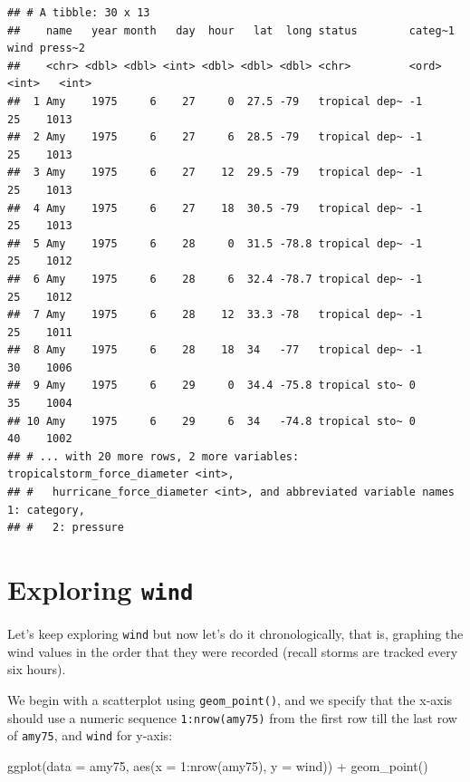 \documentclass[
]{book}
\newenvironment{Shaded}{\begin{snugshade}}{\end{snugshade}}
\newcommand{\AttributeTok}[1]{\textcolor[rgb]{0.77,0.63,0.00}{#1}}
\newcommand{\DecValTok}[1]{\textcolor[rgb]{0.00,0.00,0.81}{#1}}
\newcommand{\FunctionTok}[1]{\textcolor[rgb]{0.00,0.00,0.00}{#1}}
\newcommand{\NormalTok}[1]{#1}
\newcommand{\SpecialCharTok}[1]{\textcolor[rgb]{0.00,0.00,0.00}{#1}}
\begin{document}
\begin{verbatim}
## # A tibble: 30 x 13
##    name   year month   day  hour   lat  long status        categ~1  wind press~2
##    <chr> <dbl> <dbl> <int> <dbl> <dbl> <dbl> <chr>         <ord>   <int>   <int>
##  1 Amy    1975     6    27     0  27.5 -79   tropical dep~ -1         25    1013
##  2 Amy    1975     6    27     6  28.5 -79   tropical dep~ -1         25    1013
##  3 Amy    1975     6    27    12  29.5 -79   tropical dep~ -1         25    1013
##  4 Amy    1975     6    27    18  30.5 -79   tropical dep~ -1         25    1013
##  5 Amy    1975     6    28     0  31.5 -78.8 tropical dep~ -1         25    1012
##  6 Amy    1975     6    28     6  32.4 -78.7 tropical dep~ -1         25    1012
##  7 Amy    1975     6    28    12  33.3 -78   tropical dep~ -1         25    1011
##  8 Amy    1975     6    28    18  34   -77   tropical dep~ -1         30    1006
##  9 Amy    1975     6    29     0  34.4 -75.8 tropical sto~ 0          35    1004
## 10 Amy    1975     6    29     6  34   -74.8 tropical sto~ 0          40    1002
## # ... with 20 more rows, 2 more variables: tropicalstorm_force_diameter <int>,
## #   hurricane_force_diameter <int>, and abbreviated variable names 1: category,
## #   2: pressure
\end{verbatim}

\hypertarget{exploring-wind}{%
\section{\texorpdfstring{Exploring \texttt{wind}}{Exploring wind}}\label{exploring-wind}}

Let's keep exploring \texttt{wind} but now let's do it chronologically, that is,
graphing the wind values in the order that they were recorded (recall storms
are tracked every six hours).

We begin with a scatterplot using \texttt{geom\_point()},
and we specify that the x-axis should use a numeric sequence \texttt{1:nrow(amy75)}
from the first row till the last row of \texttt{amy75}, and \texttt{wind} for y-axis:

\begin{Shaded}
\begin{Highlighting}[]
\FunctionTok{ggplot}\NormalTok{(}\AttributeTok{data =}\NormalTok{ amy75, }\FunctionTok{aes}\NormalTok{(}\AttributeTok{x =} \DecValTok{1}\SpecialCharTok{:}\FunctionTok{nrow}\NormalTok{(amy75), }\AttributeTok{y =}\NormalTok{ wind)) }\SpecialCharTok{+}
  \FunctionTok{geom\_point}\NormalTok{()}
\end{Highlighting}
\end{Shaded}
\end{document}
